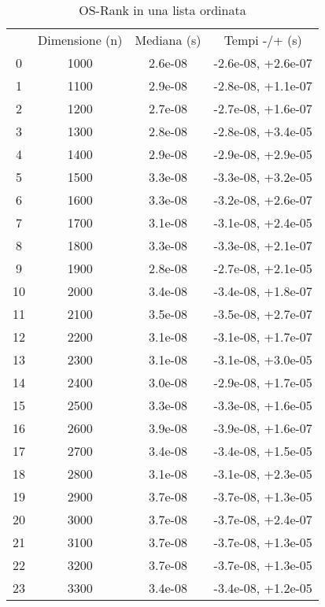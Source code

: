 \begin{table}
\centering
\caption{OS-Rank in una lista ordinata}
\label{OS-Rank in una lista ordinata}
\begin{adjustbox}{width=1\textwidth/2}
\begin{tabular}{|c|c|c|c|}
\hline
 & Dimensione (n) & Mediana (s) & Tempi -/+ (s) \\
0 & 1000 & 2.6e-08 & -2.6e-08, +2.6e-07 \\
\cline{1-4}
1 & 1100 & 2.9e-08 & -2.8e-08, +1.1e-07 \\
\cline{1-4}
2 & 1200 & 2.7e-08 & -2.7e-08, +1.6e-07 \\
\cline{1-4}
3 & 1300 & 2.8e-08 & -2.8e-08, +3.4e-05 \\
\cline{1-4}
4 & 1400 & 2.9e-08 & -2.9e-08, +2.9e-05 \\
\cline{1-4}
5 & 1500 & 3.3e-08 & -3.3e-08, +3.2e-05 \\
\cline{1-4}
6 & 1600 & 3.3e-08 & -3.2e-08, +2.6e-07 \\
\cline{1-4}
7 & 1700 & 3.1e-08 & -3.1e-08, +2.4e-05 \\
\cline{1-4}
8 & 1800 & 3.3e-08 & -3.3e-08, +2.1e-07 \\
\cline{1-4}
9 & 1900 & 2.8e-08 & -2.7e-08, +2.1e-05 \\
\cline{1-4}
10 & 2000 & 3.4e-08 & -3.4e-08, +1.8e-07 \\
\cline{1-4}
11 & 2100 & 3.5e-08 & -3.5e-08, +2.7e-07 \\
\cline{1-4}
12 & 2200 & 3.1e-08 & -3.1e-08, +1.7e-07 \\
\cline{1-4}
13 & 2300 & 3.1e-08 & -3.1e-08, +3.0e-05 \\
\cline{1-4}
14 & 2400 & 3.0e-08 & -2.9e-08, +1.7e-05 \\
\cline{1-4}
15 & 2500 & 3.3e-08 & -3.3e-08, +1.6e-05 \\
\cline{1-4}
16 & 2600 & 3.9e-08 & -3.9e-08, +1.6e-07 \\
\cline{1-4}
17 & 2700 & 3.4e-08 & -3.4e-08, +1.5e-05 \\
\cline{1-4}
18 & 2800 & 3.1e-08 & -3.1e-08, +2.3e-05 \\
\cline{1-4}
19 & 2900 & 3.7e-08 & -3.7e-08, +1.3e-05 \\
\cline{1-4}
20 & 3000 & 3.7e-08 & -3.7e-08, +2.4e-07 \\
\cline{1-4}
21 & 3100 & 3.7e-08 & -3.7e-08, +1.3e-05 \\
\cline{1-4}
22 & 3200 & 3.7e-08 & -3.7e-08, +1.3e-05 \\
\cline{1-4}
23 & 3300 & 3.4e-08 & -3.4e-08, +1.2e-05 \\

\end{tabular}
\end{adjustbox}
\end{table}
